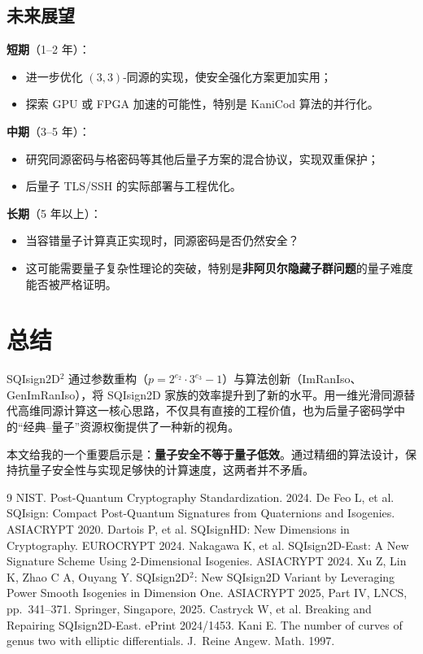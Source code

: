 \documentclass[12pt,a4paper]{ctexart}
\theoremstyle{remark}
\begin{document}
\subsection{未来展望}

\textbf{短期}（1--2 年）：
\begin{itemize}
  \item 进一步优化 $(3,3)$-同源的实现，使安全强化方案更加实用；
  \item 探索 GPU 或 FPGA 加速的可能性，特别是 KaniCod 算法的并行化。
\end{itemize}

\textbf{中期}（3--5 年）：
\begin{itemize}
  \item 研究同源密码与格密码等其他后量子方案的混合协议，实现双重保护；
  \item 后量子 TLS/SSH 的实际部署与工程优化。
\end{itemize}

\textbf{长期}（5 年以上）：
\begin{itemize}
  \item 当容错量子计算真正实现时，同源密码是否仍然安全？
  \item 这可能需要量子复杂性理论的突破，特别是\textbf{非阿贝尔隐藏子群问题}的量子难度能否被严格证明。
\end{itemize}

\section{总结}

SQIsign2D$^2$ 通过参数重构（$p = 2^{e_2} \cdot 3^{e_3} - 1$）与算法创新（ImRanIso、GenImRanIso），将 SQIsign2D 家族的效率提升到了新的水平。用一维光滑同源替代高维同源计算这一核心思路，不仅具有直接的工程价值，也为后量子密码学中的``经典--量子''资源权衡提供了一种新的视角。

本文给我的一个重要启示是：\textbf{量子安全不等于量子低效}。通过精细的算法设计，保持抗量子安全性与实现足够快的计算速度，这两者并不矛盾。

\begin{thebibliography}{9}
 NIST. Post-Quantum Cryptography Standardization. 2024.
 De Feo L, et al. SQIsign: Compact Post-Quantum Signatures from Quaternions and Isogenies. ASIACRYPT 2020.
 Dartois P, et al. SQIsignHD: New Dimensions in Cryptography. EUROCRYPT 2024.
 Nakagawa K, et al. SQIsign2D-East: A New Signature Scheme Using 2-Dimensional Isogenies. ASIACRYPT 2024.
 Xu Z, Lin K, Zhao C A, Ouyang Y. SQIsign2D$^2$: New SQIsign2D Variant by Leveraging Power Smooth Isogenies in Dimension One. ASIACRYPT 2025, Part IV, LNCS, pp.~341--371. Springer, Singapore, 2025.
 Castryck W, et al. Breaking and Repairing SQIsign2D-East. ePrint 2024/1453.
 Kani E. The number of curves of genus two with elliptic differentials. J.~Reine Angew. Math. 1997.
\end{thebibliography}
\end{document}
